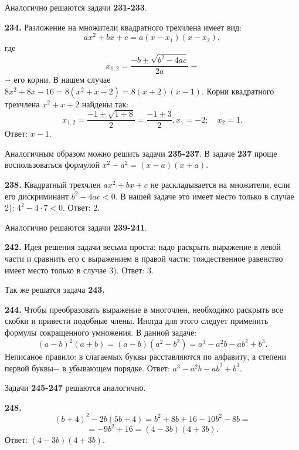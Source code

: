 Аналогично решаются задачи \textbf{231-233}.

\textbf{234.} Разложение на множители  квадратного трехчлена имеет вид:
$$ax^2+bx+c=a\left(x-x_1\right)\left(x-x_2\right),$$ где $$x_{1,2}=\frac{-b\pm\sqrt{b^2-4ac}}{2a}-$$ $-$ его корни. В нашем случае $8x^2+8x-16=8(x^2+x-2)=8\left(x+2\right)\left(x-1\right)$. Корни квадратного трехчлена $x^2+x+2$ найдены так:
$$x_{1,2}=\frac{-1\pm\sqrt{1+8}}{2}=\frac{-1\pm3}{2}, x_1=-2;\quad x_2=1.$$ \newline \null \hspace*{\fill} Ответ: $x-1$. 

Аналогичным образом можно решить задачи  \textbf{235-237}. В задаче \textbf{237} проще воспользоваться формулой $x^2-a^2=\left(x-a\right)\left(x+a\right)$.

\textbf{238.} Квадратный трехчлен $ax^2+bx+c$ не раскладывается на множители, если его дискриминант $b^2-4ac<0$. В нашей задаче это имеет место только в случае 2): $4^2-4\cdot7<0$. \newline \null \hspace*{\fill} Ответ: $2$. 

Аналогично решаются задачи  \textbf{239-241}.

\textbf{242.}  Идея решения задачи весьма проста: надо раскрыть выражение в левой части и сравнить его с выражением в правой части; тождественное равенство имеет место только в случае 3). \newline \null \hspace*{\fill} Ответ: $3$. 

Так же решатся задача  \textbf{243.}

\textbf{244.}  Чтобы преобразовать выражение в многочлен, необходимо раскрыть все скобки и привести подобные члены. Иногда для этого следует применить формулы сокращенного умножения. В данной задаче:  
$$\left(a-b\right)^2\left(a+b\right)=\left(a-b\right)\left(a^2-b^2\right)=a^3-a^2b-ab^2+b^3.$$
Неписаное правило: в слагаемых буквы расставляются по алфавиту, а степени первой буквы$-$ в убывающем порядке. \newline \null \hspace*{\fill} Ответ: $a^3-a^2b-ab^2+b^3$.  

Задачи \textbf{245-247} решаются аналогично.

\textbf{248.}  
$$\left(b+4\right)^2-2b\left(5b+4\right)=b^2+8b+16-10b^2-8b=$$ $$=-9b^2+16=\left(4-3b\right)\left(4+3b\right).$$ \newline \null \hspace*{\fill} Ответ: $(4-3b)(4+3b)$. 

